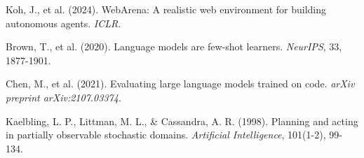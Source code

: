 \documentclass{article}
\begin{document}
\begin{enumerate}[label={[\arabic*]}]
    \item Koh, J., et al. (2024). WebArena: A realistic web environment for building autonomous agents. \textit{ICLR}.
    
    \item Brown, T., et al. (2020). Language models are few-shot learners. \textit{NeurIPS}, 33, 1877-1901.
    
    \item Chen, M., et al. (2021). Evaluating large language models trained on code. \textit{arXiv preprint arXiv:2107.03374}.
    
    \item Kaelbling, L. P., Littman, M. L., \& Cassandra, A. R. (1998). Planning and acting in partially observable stochastic domains. \textit{Artificial Intelligence}, 101(1-2), 99-134.
\end{enumerate}
\end{document}
